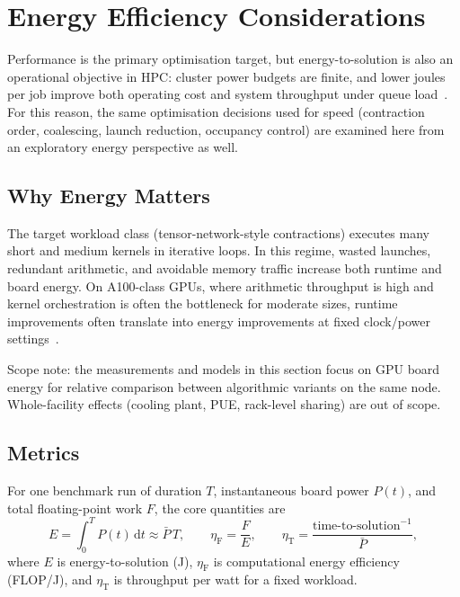 \section{Energy Efficiency Considerations}\label{sec:energy-efficiency}

Performance is the primary optimisation target, but
energy-to-solution is also an operational objective in HPC: cluster power
budgets are finite, and lower joules per job improve both operating cost and
system throughput under queue load~\cite{kocot2023energy-aware,green500-top500}.
For this reason, the same optimisation decisions used for speed (contraction
order, coalescing, launch reduction, occupancy control) are examined here from
an exploratory energy perspective as well.

\subsection{Why Energy Matters}

The target workload class (tensor-network-style contractions) executes many
short and medium kernels in iterative loops. In this regime, wasted launches,
redundant arithmetic, and avoidable memory traffic increase both runtime and
board energy. On A100-class GPUs, where arithmetic throughput is high and
kernel orchestration is often the bottleneck for moderate sizes, runtime
improvements often translate into energy improvements at fixed
clock/power settings~\cite{nvidia2020a100,nvidia-cuda-best-practices}.

Scope note: the measurements and models in this section focus on GPU board
energy for relative comparison between algorithmic variants on the same node.
Whole-facility effects (cooling plant, PUE, rack-level sharing) are out of
scope.

\subsection{Metrics}

For one benchmark run of duration $T$, instantaneous board power $P(t)$, and
total floating-point work $F$, the core quantities are
\[
  E = \int_0^T P(t)\,\mathrm{d}t \approx \bar P\,T,
  \qquad
  \eta_{\mathrm{F}} = \frac{F}{E},
  \qquad
  \eta_{\mathrm{T}} = \frac{\text{time-to-solution}^{-1}}{\bar P},
\]
where $E$ is energy-to-solution (J), $\eta_{\mathrm{F}}$ is computational
energy efficiency (FLOP/J), and $\eta_{\mathrm{T}}$ is throughput per watt for a
fixed workload.

